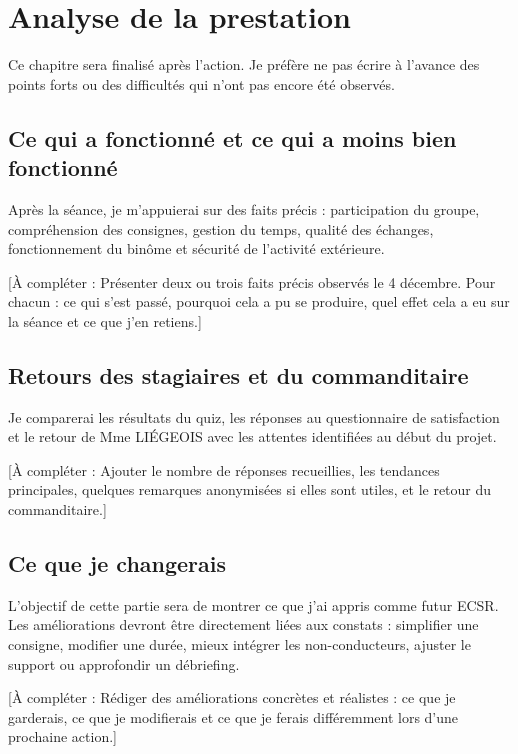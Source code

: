 \begingroup\color{red}
\chapter{Analyse de la prestation}
Ce chapitre sera finalisé après l’action. Je préfère ne pas écrire à l’avance des points forts ou des difficultés qui n’ont pas encore été observés.

\section{Ce qui a fonctionné et ce qui a moins bien fonctionné}

Après la séance, je m’appuierai sur des faits précis : participation du groupe, compréhension des consignes, gestion du temps, qualité des échanges, fonctionnement du binôme et sécurité de l’activité extérieure.

[À compléter : Présenter deux ou trois faits précis observés le 4 décembre. Pour chacun : ce qui s’est passé, pourquoi cela a pu se produire, quel effet cela a eu sur la séance et ce que j’en retiens.]

\section{Retours des stagiaires et du commanditaire}

Je comparerai les résultats du quiz, les réponses au questionnaire de satisfaction et le retour de Mme LIÉGEOIS avec les attentes identifiées au début du projet.

[À compléter : Ajouter le nombre de réponses recueillies, les tendances principales, quelques remarques anonymisées si elles sont utiles, et le retour du commanditaire.]

\section{Ce que je changerais}

L’objectif de cette partie sera de montrer ce que j’ai appris comme futur ECSR. Les améliorations devront être directement liées aux constats : simplifier une consigne, modifier une durée, mieux intégrer les non-conducteurs, ajuster le support ou approfondir un débriefing.

[À compléter : Rédiger des améliorations concrètes et réalistes : ce que je garderais, ce que je modifierais et ce que je ferais différemment lors d’une prochaine action.]
\endgroup
